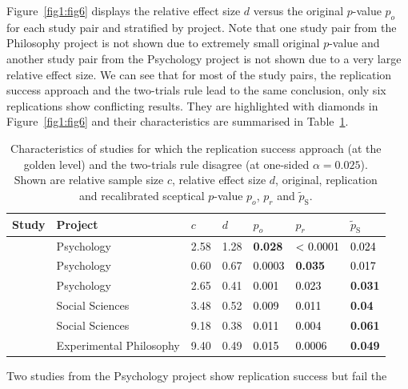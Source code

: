 Figure~\ref{fig1:fig6} displays the relative effect size $d$ versus the original
$p$-value $p_o$ for each study pair and stratified by project. Note that one
study pair from the Philosophy project is not shown due to extremely small
original $p$-value and another study pair from the Psychology project is not
shown due to a very large relative effect size. We can see that for most of the
study pairs, the replication success approach and the two-trials rule lead to
the same conclusion, only six replications show conflicting results. They are
highlighted with diamonds in Figure~\ref{fig1:fig6} and their characteristics are
summarised in Table~\ref{tbl:discrep}.
\begin{table}[!ht]
    \centering
  \caption{Characteristics of studies for which the replication success approach
    (at the golden level) and the two-trials rule disagree (at one-sided
    $\alpha = 0.025$). Shown are relative sample size $c$, relative effect size
    $d$, original, replication and recalibrated sceptical $p$-value $p_o$, $p_r$
    and $\tilde{p}_{\mathrm{S}}$.}
  \label{tbl:discrep}
\resizebox{\textwidth}{!} {
\begin{tabular}{lllllll}
  \toprule
Study & Project & $c$ & $d$ & $p_o$ & $p_r$ & $\tilde{p}_{\mathrm{S}}$ \\
  \midrule
\citet{Schmidt2008} & Psychology & 2.58 & 1.28 & \textbf{0.028} & \textcolor{black}{< 0.0001} & \textcolor{black}{0.024} \\
  \citet{Oberauer2008} & Psychology & 0.60 & 0.67 & \textcolor{black}{0.0003} & \textbf{0.035} & \textcolor{black}{0.017} \\
  \citet{Payne2008} & Psychology & 2.65 & 0.41 & \textcolor{black}{0.001} & \textcolor{black}{0.023} & \textbf{0.031} \\
  \citet{Balafoutas2012} & Social Sciences & 3.48 & 0.52 & \textcolor{black}{0.009} & \textcolor{black}{0.011} & \textbf{0.04} \\
  \citet{Pyc2010} & Social Sciences & 9.18 & 0.38 & \textcolor{black}{0.011} & \textcolor{black}{0.004} & \textbf{0.061} \\
  \citet{Nichols2006} & Experimental Philosophy & 9.40 & 0.49 & \textcolor{black}{0.015} & \textcolor{black}{0.0006} & \textbf{0.049} \\
   \bottomrule
\end{tabular}%
}
\end{table}
Two studies from the Psychology project show replication success but fail the

